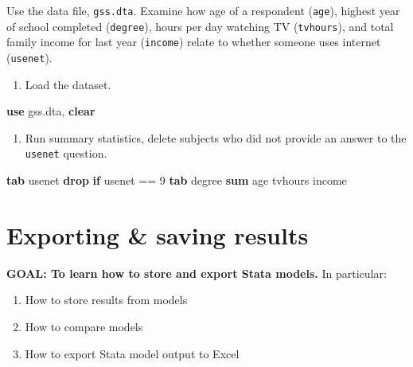 \documentclass[
]{book}
\newenvironment{Shaded}{\begin{snugshade}}{\end{snugshade}}
\newcommand{\KeywordTok}[1]{\textcolor[rgb]{0.13,0.29,0.53}{\textbf{#1}}}
\newcommand{\NormalTok}[1]{#1}
\providecommand{\tightlist}{%
  \setlength{\itemsep}{0pt}\setlength{\parskip}{0pt}}
\begin{document}
\begin{alert}

Use the data file, \texttt{gss.dta}. Examine how age of a respondent (\texttt{age}), highest year of school completed (\texttt{degree}), hours per day watching TV (\texttt{tvhours}), and total family income for last year (\texttt{income}) relate to whether someone uses internet (\texttt{usenet}).

\begin{enumerate}
\def\labelenumi{\arabic{enumi}.}
\tightlist
\item
  Load the dataset.
\end{enumerate}

\begin{Shaded}
\begin{Highlighting}[]
\KeywordTok{use}\NormalTok{ gss.dta, }\KeywordTok{clear} 
\end{Highlighting}
\end{Shaded}

\begin{enumerate}
\def\labelenumi{\arabic{enumi}.}
\setcounter{enumi}{1}
\tightlist
\item
  Run summary statistics, delete subjects who did not provide an answer to the \texttt{usenet} question.
\end{enumerate}

\begin{Shaded}
\begin{Highlighting}[]
\KeywordTok{tab}\NormalTok{ usenet }
\KeywordTok{drop} \KeywordTok{if}\NormalTok{ usenet == 9}
\KeywordTok{tab}\NormalTok{ degree }
\KeywordTok{sum}\NormalTok{ age tvhours income }
\end{Highlighting}
\end{Shaded}

\end{alert}

\hypertarget{exporting-saving-results}{%
\section{Exporting \& saving results}\label{exporting-saving-results}}

\begin{alert}

\textbf{GOAL: To learn how to store and export Stata models.} In particular:

\begin{enumerate}
\def\labelenumi{\arabic{enumi}.}
\tightlist
\item
  How to store results from models
\item
  How to compare models
\item
  How to export Stata model output to Excel
\end{enumerate}

\end{alert}
\end{document}
